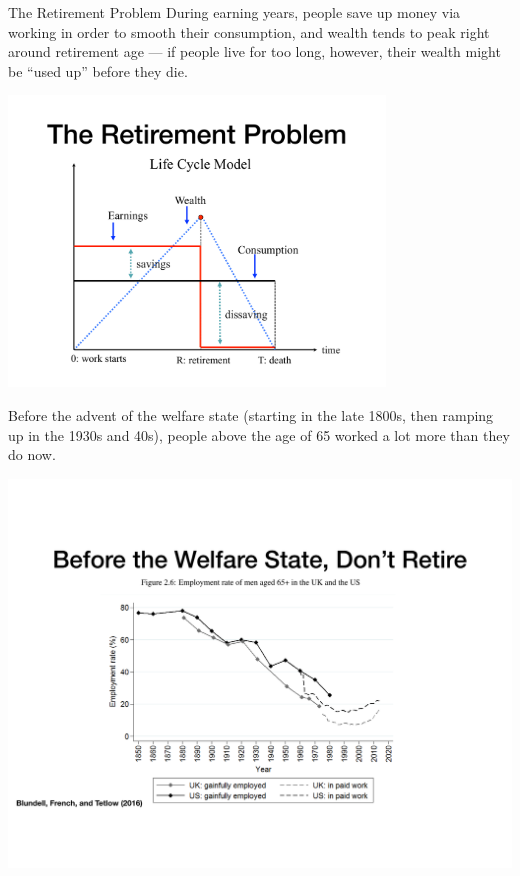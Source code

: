 \documentclass[10pt]{extarticle}
\begin{document}
  \begin{problem}{The Retirement Problem}
    During earning years, people save up money via working in order to smooth their consumption, and wealth tends to peak right around retirement age --- if people live for too long, however, their wealth might be ``used up'' before they die.
    \begin{center}
      \includegraphics[width=10cm]{images/retirement_problem.pdf}
    \end{center}
    Before the advent of the welfare state (starting in the late 1800s, then ramping up in the 1930s and 40s), people above the age of 65 worked a lot more than they do now.
    \begin{center}
      \includegraphics[width=\textwidth]{images/working_hours.pdf}
    \end{center}
    \begin{itemize}

\end{itemize}
\end{problem}
\end{document}
